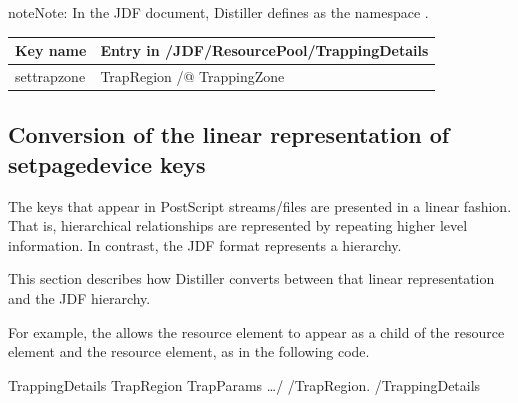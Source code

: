 \documentclass[letterpaper,12pt,english,openany,oneside]{sphinxmanual}
\begin{document}
\begin{sphinxadmonition}{note}{Note:}
In the JDF document, Distiller defines  as the namespace  .
\end{sphinxadmonition}


\begin{savenotes}\sphinxattablestart
\centering
{}
\sphinxthecaptionisattop
{}\label{\detokenize{PDF_Create_JDF:id1}}
\sphinxaftertopcaption
\begin{tabulary}{\linewidth}[t]{|T|T|}
\hline
\sphinxstyletheadfamily 
Key name
&\sphinxstyletheadfamily 
Entry in /JDF/ResourcePool/TrappingDetails
\\
\hline
settrapzone
&
TrapRegion /@ TrappingZone
\\
\hline
\end{tabulary}
\par
\sphinxattableend\end{savenotes}




\subsection{Conversion of the linear representation of setpagedevice keys}
\label{\detokenize{PDF_Create_JDF:conversion-of-the-linear-representation-of-setpagedevice-keys}}
The  keys that appear in PostScript streams/files are presented in a linear fashion. That is, hierarchical relationships are represented by repeating higher level information. In contrast, the JDF format represents a hierarchy.

This section describes how Distiller converts between that linear representation and the JDF hierarchy.

For example, the  allows the  resource element to appear as a child of the  resource element and the  resource element, as in the following code.

\begin{sphinxVerbatim}[commandchars=\\\{\}]
\PYGZlt{}TrappingDetails\PYGZgt{}
     \PYGZlt{}TrapRegion\PYGZgt{}
         \PYGZlt{}TrapParams …/\PYGZgt{}
     \PYGZlt{}/TrapRegion.\PYGZgt{}
 \PYGZlt{}/TrappingDetails\PYGZgt{}
\end{sphinxVerbatim}
\end{document}
